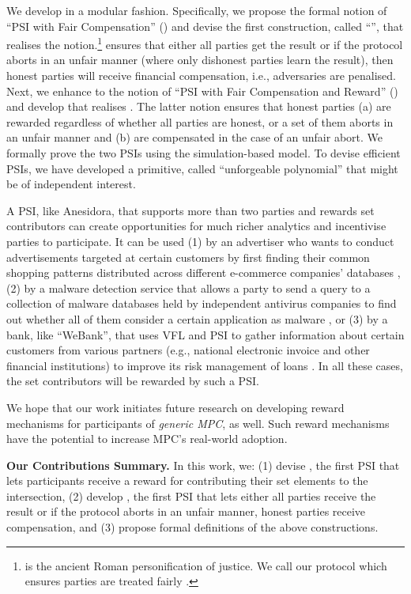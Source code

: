 We develop \withRew in a modular fashion. Specifically, we propose the formal notion of ``PSI with Fair Compensation'' (\p) and devise the first construction, called ``\withFai'', that realises the notion.\footnote{\withFai is the ancient Roman personification of justice. We call our protocol which ensures parties are treated fairly \withFai.} \p ensures that either all parties get the result or if the protocol aborts in an unfair manner (where only dishonest parties learn the result), then honest parties will receive financial compensation, i.e., adversaries are penalised. Next, we enhance \p to the notion of ``PSI with Fair Compensation and Reward'' (\ep) and develop \withRew that realises \ep. The latter notion ensures that honest parties (a) are rewarded regardless of whether all parties are honest, or a set of them aborts in an unfair manner and (b) are compensated in the case of an unfair abort. We formally prove the two PSIs using the simulation-based model. To devise efficient PSIs, we have developed a primitive, called ``unforgeable polynomial'' that might be of independent interest. 

A PSI, like Anesidora, that supports more than two parties and rewards set contributors can create opportunities for much richer analytics and incentivise parties to participate. It can be used (1) by an advertiser who wants to conduct advertisements targeted at certain customers by first finding their common shopping patterns distributed across different e-commerce companies' databases \cite{IonKNPSS0SY20}, (2) by a malware detection service that allows a party to send a query to a collection of malware databases held by independent antivirus companies to find out whether all of them consider a certain application as malware \cite{TamrakarLPEPA17}, or (3) by a bank, like ``WeBank'', that uses VFL and PSI to gather information about certain customers from various partners (e.g., national electronic invoice and other financial institutions) to improve its risk management of loans \cite{ChengLCY20}. In all these cases, the set contributors will be rewarded by such a PSI. 



We hope that our work initiates future research on developing reward mechanisms for participants of \emph{generic MPC}, as well. Such reward mechanisms have the potential to increase MPC's real-world adoption.  

\begin{paragraph}
%
{\textbf{Our Contributions Summary.}} In this work, we: (1) devise \withRew, the first PSI that lets participants receive a reward for contributing their set elements to the intersection, (2) develop \withFai, the first PSI that lets either all parties receive the result or if the protocol aborts in an unfair manner,  honest parties receive compensation, and (3) propose formal definitions of the above constructions.
%
\end{paragraph}



